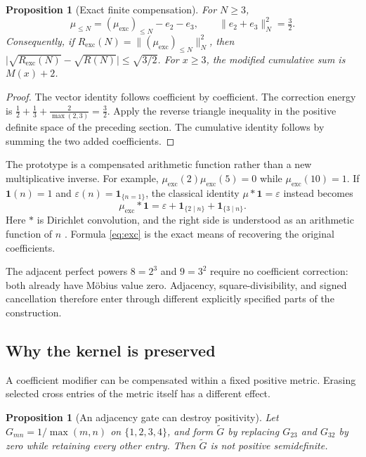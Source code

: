 \documentclass[11pt]{article}
\newtheorem{proposition}[theorem]{Proposition}
\theoremstyle{definition}
\theoremstyle{remark}
\begin{document}
\begin{proposition}[Exact finite compensation]
For $N\ge3$,
\begin{equation}\label{eq:exc}
\mu_{\le N}=(\mu_{\mathrm{exc}})_{\le N}-e_2-e_3,\qquad \|e_2+e_3\|_N^2=\tfrac32.
\end{equation}
Consequently, if $R_{\mathrm{exc}}(N)=\|(\mu_{\mathrm{exc}})_{\le N}\|_N^2$, then
$\big|\sqrt{R_{\mathrm{exc}}(N)}-\sqrt{R(N)}\big|\le\sqrt{3/2}$.
For $x\ge3$, the modified cumulative sum is $M(x)+2$.
\end{proposition}

\begin{proof}
The vector identity follows coefficient by coefficient. The correction energy is $\frac12+\frac13+\frac{2}{\max(2,3)}=\frac32$. Apply the reverse triangle inequality in the positive definite space of the preceding section. The cumulative identity follows by summing the two added coefficients.
\end{proof}

The prototype is a compensated arithmetic function rather than a new multiplicative inverse. For example, $\mu_{\mathrm{exc}}(2)\mu_{\mathrm{exc}}(5)=0$ while $\mu_{\mathrm{exc}}(10)=1$. If $\mathbf 1(n)=1$ and $\varepsilon(n)=\mathbf 1_{\{n=1\}}$, the classical identity $\mu*\mathbf 1=\varepsilon$ instead becomes
\begin{equation}
\mu_{\mathrm{exc}}*\mathbf 1=\varepsilon+\mathbf 1_{\{2\mid n\}}+\mathbf 1_{\{3\mid n\}}.
\end{equation}
Here $*$ is Dirichlet convolution, and the right side is understood as an arithmetic function of $n$ \cite{dlmf275}. Formula \eqref{eq:exc} is the exact means of recovering the original coefficients.

The adjacent perfect powers $8=2^3$ and $9=3^2$ require no coefficient correction: both already have M\"obius value zero. Adjacency, square-divisibility, and signed cancellation therefore enter through different explicitly specified parts of the construction.

\subsection{Why the kernel is preserved}

A coefficient modifier can be compensated within a fixed positive metric. Erasing selected cross entries of the metric itself has a different effect.

\begin{proposition}[An adjacency gate can destroy positivity]
Let $G_{mn}=1/\max(m,n)$ on $\{1,2,3,4\}$, and form $\widetilde G$ by replacing $G_{23}$ and $G_{32}$ by zero while retaining every other entry. Then $\widetilde G$ is not positive semidefinite.
\end{proposition}
\end{document}
